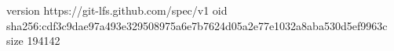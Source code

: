 version https://git-lfs.github.com/spec/v1
oid sha256:cdf3c9dae97a493e329508975a6e7b7624d05a2e77e1032a8aba530d5ef9963c
size 194142
